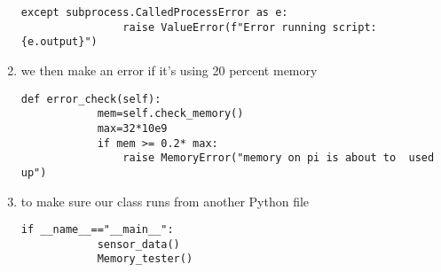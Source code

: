\begin{enumerate}
\begin{lstlisting}[style=mystyle]
            except subprocess.CalledProcessError as e:
                raise ValueError(f"Error running script:{e.output}")
    \end{lstlisting}
    \item  we then  make an error if it's using  20 percent memory
    \begin{lstlisting}[style=mystyle]
        def error_check(self):
            mem=self.check_memory()
            max=32*10e9
            if mem >= 0.2* max:
                raise MemoryError("memory on pi is about to  used up")
    \end{lstlisting}
    \item to make sure  our class runs from another Python file 
    \begin{lstlisting}[style=mystyle]
        if __name__=="__main__":
            sensor_data()
            Memory_tester()
    \end{lstlisting}
\end{enumerate}
